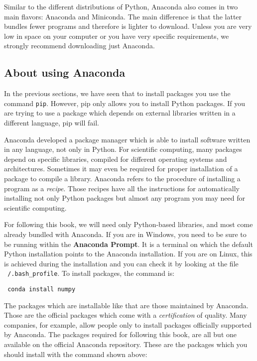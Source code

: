 Similar to the different distributions of Python, Anaconda also comes in two main flavors: Anaconda and Miniconda. The main difference is that the latter bundles fewer programs and therefore is lighter to download. Unless you are very low in space on your computer or you have very specific requirements, we strongly recommend downloading just Anaconda. 

\subsection{About using Anaconda}
In the previous sections, we have seen that to install packages you use the command \texttt{pip}. However, pip only allows you to install Python packages. If you are trying to use a package which depends on external libraries written in a different language, pip will fail. 


Anaconda developed a package manager which is able to install software written in any language, not only in Python. For scientific computing, many packages depend on specific libraries, compiled for different operating systems and architectures. Sometimes it may even be required for proper installation of a package to compile a library. Anaconda refers to the procedure of installing a program as a \emph{recipe}. Those recipes have all the instructions for automatically installing not only Python packages but almost any program you may need for scientific computing. 

For following this book, we will need only Python-based libraries, and most come already bundled with Anaconda. If you are in Windows, you need to be sure to be running within the \textbf{Anaconda Prompt}. It is a terminal on which the default Python installation points to the Anaconda installation. If you are on Linux, this is achieved during the installation and you can check it by looking at the file \texttt{~/.bash_profile}. To install packages, the command is:
\begin{verbatim}
 conda install numpy
\end{verbatim}

The packages which are installable like that are those maintained by Anaconda. Those are the official packages which come with a \emph{certification} of quality. Many companies, for example, allow people only to install packages officially supported by Anaconda. The packages required for following this book, are all but one available on the official Anaconda repository. These are the packages which you should install with the command shown above: 

